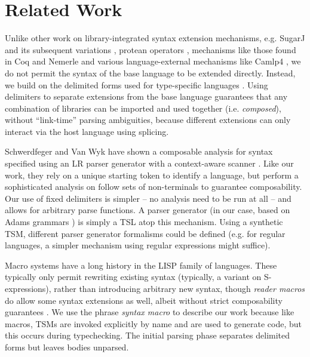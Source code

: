 \documentclass{sig-alternate}[10pt]
\begin{document}
\section{Related Work}\label{related}
Unlike other work on library-integrated syntax extension mechanisms, e.g. SugarJ \cite{erdweg2011sugarj} and its subsequent variations \cite{erdweg2013framework}, protean operators \cite{conf/aosd/IchikawaC14}, mechanisms like those found in Coq \cite{Coq:manual,5134} and Nemerle \cite{skalski2004meta} and various language-external mechanisms like Camlp4 \cite{ocaml-manual}, we do not permit the syntax of the base language to be extended directly. Instead, we build on the delimited forms used for type-specific languages \cite{TSLs}. Using delimiters to separate extensions from the base language guarantees that any combination of  libraries can be imported and used together (i.e. \emph{composed}), without ``link-time'' parsing ambiguities, because different extensions can only interact via the host language using splicing.%

Schwerdfeger and Van Wyk have shown a composable analysis for syntax specified using an LR parser generator with a context-aware scanner \cite{conf/pldi/SchwerdfegerW09}. Like our work, they rely on a unique starting token to identify a language, but perform a sophisticated analysis on follow sets of non-terminals to guarantee composability. Our use of fixed delimiters is simpler -- no analysis need to be run at all -- and allows for arbitrary parse functions. A parser generator (in our case, based on Adams grammars \cite{Adams:2013:PPI:2429069.2429129}) is simply a TSL atop this mechanism. Using a synthetic TSM, different parser generator formalisms could be defined (e.g. for regular languages, a simpler mechanism using regular expressions might suffice).

Macro systems have a long history in the LISP family of languages. These typically only permit rewriting existing syntax (typically, a variant on S-expressions), rather than introducing arbitrary new syntax, though \emph{reader macros} do allow some syntax extensions as well, albeit without strict composability guarantees \cite{steele1990common}. We use the phrase \emph{syntax macro} to describe our work because like macros, TSMs are invoked explicitly by name and are used to generate code, but this occurs during typechecking. The initial parsing phase separates delimited forms but leaves bodies unparsed. %
\end{document}
